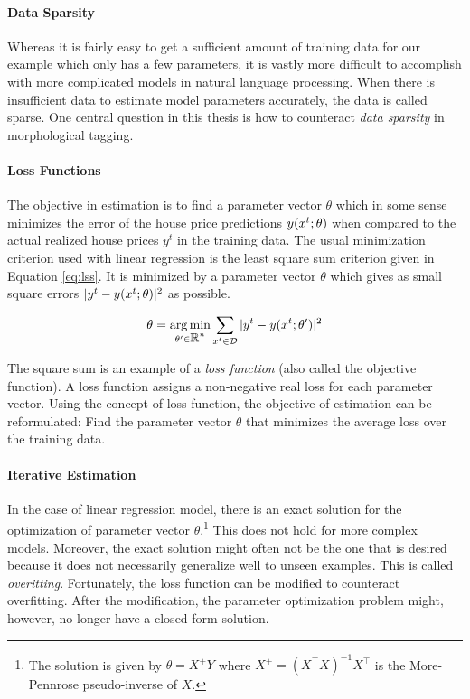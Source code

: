 \paragraph{Data Sparsity} Whereas it is fairly easy to get a
sufficient amount of training data for our example which only has a
few parameters, it is vastly more difficult to accomplish with more
complicated models in natural language processing. When there is
insufficient data to estimate model parameters accurately, the data is
called sparse. One central question in this thesis is how to
counteract {\it data sparsity} in morphological tagging.

\paragraph{Loss Functions} The objective in estimation is to find a
parameter vector $\theta$ which in some sense minimizes the error of
the house price predictions $y(x^t\mbox{$ ; \, $} \theta)$ when compared to
the actual realized house prices $y^t$ in the training data. The usual
minimization criterion used with linear regression is the least square
sum criterion given in Equation \ref{eq:lss}. It is minimized by a
parameter vector $\theta$ which gives as small square errors $|y^t -
y(x^t \mbox{$ ; \, $} \theta)|^2$ as possible.

\begin{equation}
\theta = \operatorname*{arg\,min}_{\theta' \in \mbox{$\mathbb R$}^n} \sum_{x^t \in \mathcal{D}} | y^t - y(x^t\mbox{$ ; \, $} \theta')|^2\label{eq:lss}
\end{equation}

The square sum is an example of a {\it loss function} (also called the
objective function). A loss function assigns a non-negative real loss
for each parameter vector. Using the concept of loss function, the
objective of estimation can be reformulated: Find the parameter vector
$\theta$ that minimizes the average loss over the training data.

\paragraph{Iterative Estimation} In the case of linear regression
model, there is an exact solution for the optimization of parameter
vector $\theta$.\footnote{The solution is given by $\theta = X^+Y$
  where $X^+ = (X^\top X)^{-1}X^\top$ is the More-Pennrose
  pseudo-inverse of $X$.} This does not hold for more complex
models. Moreover, the exact solution might often not be the one that
is desired because it does not necessarily generalize well to unseen
examples. This is called {\it overitting}. Fortunately, the loss
function can be modified to counteract overfitting. After the
modification, the parameter optimization problem might, however, no
longer have a closed form solution.

